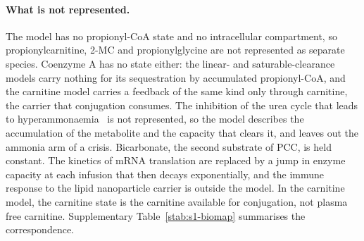 \paragraph{What is not represented.} The model has no propionyl-CoA state and no
intracellular compartment, so propionylcarnitine, 2-MC and propionylglycine are not
represented as separate species. Coenzyme A has no state either: the linear- and
saturable-clearance models carry nothing for its sequestration by accumulated
propionyl-CoA, and the carnitine model carries a feedback of the same kind only through
carnitine, the carrier that conjugation consumes. The inhibition of the urea cycle that
leads to hyperammonaemia~\cite{pathophys_complications} is not represented, so the model
describes the accumulation of the metabolite and the capacity that clears it, and leaves
out the ammonia arm of a crisis. Bicarbonate, the second substrate of PCC, is held constant. The kinetics of mRNA
translation are replaced by a jump in enzyme capacity at each infusion that then decays
exponentially, and the immune response to the lipid nanoparticle carrier is outside the
model. In the carnitine model, the carnitine state is the carnitine available for
conjugation, not plasma free carnitine. Supplementary Table~\ref{stab:s1-biomap} summarises
the correspondence.

